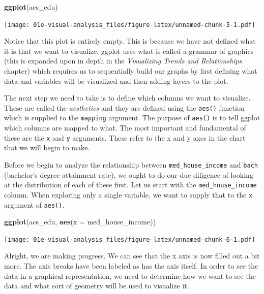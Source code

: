 \documentclass[
]{book}
\newenvironment{Shaded}{\begin{snugshade}}{\end{snugshade}}
\newcommand{\DataTypeTok}[1]{\textcolor[rgb]{0.13,0.29,0.53}{#1}}
\newcommand{\KeywordTok}[1]{\textcolor[rgb]{0.13,0.29,0.53}{\textbf{#1}}}
\newcommand{\NormalTok}[1]{#1}
\begin{document}
\begin{Shaded}
\begin{Highlighting}[]
\KeywordTok{ggplot}\NormalTok{(acs\_edu)}
\end{Highlighting}
\end{Shaded}

\texttt{[image: 01e-visual-analysis\_files/figure-latex/unnamed-chunk-5-1.pdf]}

Notice that this plot is entirely empty. This is because we have not defined what it is that we want to visualize. ggplot uses what is called a grammar of graphics (this is expanded upon in depth in the \emph{Visualizing Trends and Relationships} chapter) which requires us to sequentially build our graphs by first defining what data and variables will be visualized and then adding layers to the plot.

The next step we need to take is to define which columns we want to visualize. These are called the \emph{aesthetics} and they are defined using the \texttt{aes()} function which is supplied to the \texttt{mapping} argument. The purpose of \texttt{aes()} is to tell ggplot which columns are mapped to what. The most important and fundamental of these are the \texttt{x} and \texttt{y} arguments. These refer to the x and y axes in the chart that we will begin to make.

Before we begin to analyze the relationship between \texttt{med\_house\_income} and \texttt{bach} (bachelor's degree attainment rate), we ought to do our due diligence of looking at the distribution of each of these first. Let us start with the \texttt{med\_house\_income} column. When exploring only a single variable, we want to supply that to the \texttt{x} argument of \texttt{aes()}.

\begin{Shaded}
\begin{Highlighting}[]
\KeywordTok{ggplot}\NormalTok{(acs\_edu, }\KeywordTok{aes}\NormalTok{(}\DataTypeTok{x =}\NormalTok{ med\_house\_income))}
\end{Highlighting}
\end{Shaded}

\texttt{[image: 01e-visual-analysis\_files/figure-latex/unnamed-chunk-6-1.pdf]}

Alright, we are making progress. We can see that the x axis is now filled out a bit more. The axis breaks have been labeled as has the axis itself. In order to see the data in a graphical representation, we need to determine how we want to see the data and what sort of geometry will be used to visualize it.
\end{document}
